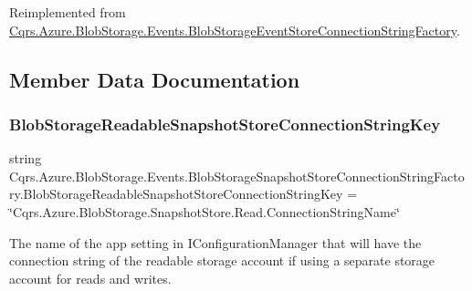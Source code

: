Reimplemented from \hyperlink{classCqrs_1_1Azure_1_1BlobStorage_1_1Events_1_1BlobStorageEventStoreConnectionStringFactory_a002b45d6a893b1b3024b0e7c97f1c9ac_a002b45d6a893b1b3024b0e7c97f1c9ac}{Cqrs.\+Azure.\+Blob\+Storage.\+Events.\+Blob\+Storage\+Event\+Store\+Connection\+String\+Factory}.



\subsection{Member Data Documentation}
\mbox{\label{classCqrs_1_1Azure_1_1BlobStorage_1_1Events_1_1BlobStorageSnapshotStoreConnectionStringFactory_af194b50ec2e3de65c0207776491777d3_af194b50ec2e3de65c0207776491777d3}} 
\subsubsection{\texorpdfstring{Blob\+Storage\+Readable\+Snapshot\+Store\+Connection\+String\+Key}{BlobStorageReadableSnapshotStoreConnectionStringKey}}
{\footnotesize\ttfamily string Cqrs.\+Azure.\+Blob\+Storage.\+Events.\+Blob\+Storage\+Snapshot\+Store\+Connection\+String\+Factory.\+Blob\+Storage\+Readable\+Snapshot\+Store\+Connection\+String\+Key = \char`\"{}Cqrs.\+Azure.\+Blob\+Storage.\+Snapshot\+Store.\+Read.\+Connection\+String\+Name\char`\"{}\hspace{0.3cm}{\ttfamily [static]}}



The name of the app setting in I\+Configuration\+Manager that will have the connection string of the readable storage account if using a separate storage account for reads and writes. 

